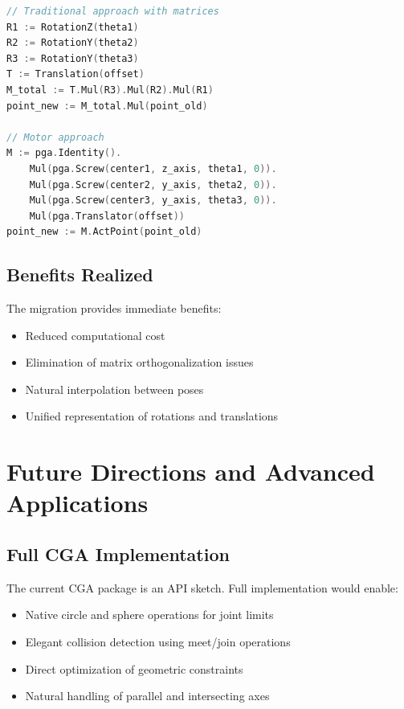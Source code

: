 \documentclass[11pt]{article}
\begin{document}
\begin{lstlisting}[language=Go, caption=Traditional vs. Motor approach]
// Traditional approach with matrices
R1 := RotationZ(theta1)
R2 := RotationY(theta2)  
R3 := RotationY(theta3)
T := Translation(offset)
M_total := T.Mul(R3).Mul(R2).Mul(R1)
point_new := M_total.Mul(point_old)

// Motor approach
M := pga.Identity().
    Mul(pga.Screw(center1, z_axis, theta1, 0)).
    Mul(pga.Screw(center2, y_axis, theta2, 0)).
    Mul(pga.Screw(center3, y_axis, theta3, 0)).
    Mul(pga.Translator(offset))
point_new := M.ActPoint(point_old)
\end{lstlisting}

\subsection{Benefits Realized}

The migration provides immediate benefits:
\begin{itemize}
    \item Reduced computational cost
    \item Elimination of matrix orthogonalization issues
    \item Natural interpolation between poses
    \item Unified representation of rotations and translations
\end{itemize}

\section{Future Directions and Advanced Applications}

\subsection{Full CGA Implementation}

The current CGA package is an API sketch. Full implementation would enable:
\begin{itemize}
    \item Native circle and sphere operations for joint limits
    \item Elegant collision detection using meet/join operations  
    \item Direct optimization of geometric constraints
    \item Natural handling of parallel and intersecting axes
\end{itemize}
\end{document}
